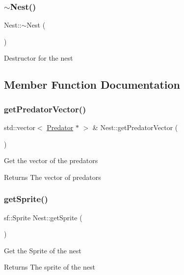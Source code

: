 \subsubsection{\texorpdfstring{$\sim$Nest()}{~Nest()}}
{\footnotesize\ttfamily Nest\+::$\sim$\+Nest (\begin{DoxyParamCaption}{ }\end{DoxyParamCaption})}



Destructor for the nest 



\subsection{Member Function Documentation}
\mbox{\label{class_nest_acbc88a9cff28534b03754a48b820b10b}} 
\subsubsection{\texorpdfstring{getPredatorVector()}{getPredatorVector()}}
{\footnotesize\ttfamily std\+::vector$<$ \mbox{\hyperlink{class_predator}{Predator}} $\ast$ $>$ \& Nest\+::get\+Predator\+Vector (\begin{DoxyParamCaption}{ }\end{DoxyParamCaption})}



Get the vector of the predators 

\begin{DoxyReturn}{Returns}
The vector of predators
\end{DoxyReturn}
\mbox{\label{class_nest_a5e2be5f916b9c19e48ad93b1b6d67f56}} 
\subsubsection{\texorpdfstring{getSprite()}{getSprite()}}
{\footnotesize\ttfamily sf\+::\+Sprite Nest\+::get\+Sprite (\begin{DoxyParamCaption}{ }\end{DoxyParamCaption})}



Get the Sprite of the nest 

\begin{DoxyReturn}{Returns}
The sprite of the nest
\end{DoxyReturn}
\mbox{\label{class_nest_a3f0d0175e349409ef2cab7e9bae0fb81}} 
